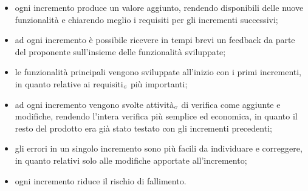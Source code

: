 \begin{itemize}
	\item ogni incremento produce un valore aggiunto, rendendo disponibili delle nuove funzionalità e chiarendo meglio i requisiti per gli incrementi successivi;
	\item ad ogni incremento è possibile ricevere in tempi brevi un feedback da parte del proponente sull'insieme delle funzionalità sviluppate;
	\item le funzionalità principali vengono sviluppate all'inizio con i primi incrementi, in quanto relative ai requisiti$_{\scaleto{G}{3pt}}$ più importanti;
	\item ad ogni incremento vengono svolte attività$_{\scaleto{G}{3pt}}$ di verifica come aggiunte e modifiche, rendendo l'intera verifica più semplice ed economica, in quanto il resto del prodotto era già stato testato con gli incrementi precedenti;
	\item gli errori in un singolo incremento sono più facili da individuare e correggere, in quanto relativi solo alle modifiche apportate all'incremento;
	\item ogni incremento riduce il rischio di fallimento.
\end{itemize}